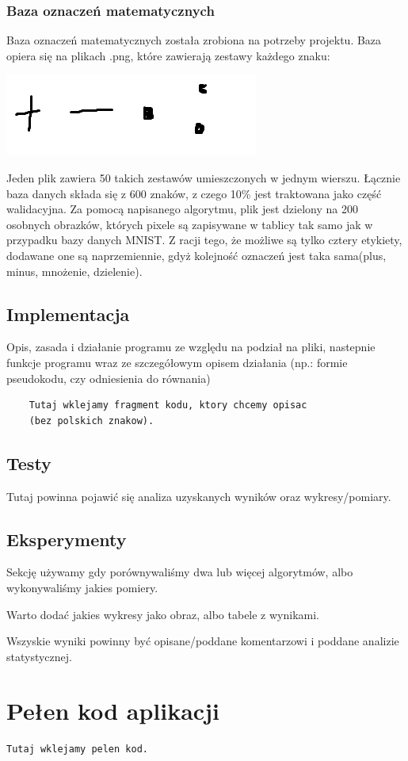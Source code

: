 \documentclass[12pt,a4paper]{article}
\begin{document}
	\subsubsection*{Baza oznaczeń matematycznych}
	Baza oznaczeń matematycznych została zrobiona na potrzeby projektu. Baza opiera się na plikach .png, które zawierają zestawy każdego znaku:
	\begin{center}
	\includegraphics[scale=1]{dane1.png} 
	\end{center}	 
	Jeden plik zawiera 50 takich zestawów umieszczonych w jednym wierszu. Łącznie baza danych składa się z 600 znaków, z czego 10\%  jest traktowana jako część walidacyjna. Za pomocą napisanego algorytmu, plik jest dzielony na 200 osobnych obrazków, których pixele są zapisywane w tablicy tak samo jak w przypadku bazy danych MNIST. Z racji tego, że możliwe są tylko cztery etykiety, dodawane one są naprzemiennie, gdyż kolejność oznaczeń jest taka sama(plus, minus, mnożenie, dzielenie). 
	\subsection*{Implementacja}
	Opis, zasada i działanie programu ze względu na podział na pliki, nastepnie	funkcje programu wraz ze szczegółowym opisem działania (np.: formie pseudokodu, czy odniesienia do równania)
	\begin{lstlisting}
	Tutaj wklejamy fragment kodu, ktory chcemy opisac 
	(bez polskich znakow).
	\end{lstlisting}
	\subsection*{Testy}
	Tutaj powinna pojawić się analiza uzyskanych wyników oraz wykresy/pomiary.
	
	\subsection*{Eksperymenty}
	Sekcję używamy gdy porównywaliśmy dwa lub więcej algorytmów, albo wykonywaliśmy jakies pomiery.
	
	Warto dodać jakies wykresy jako obraz, albo tabele z wynikami. 
	
	Wszyskie wyniki powinny być opisane/poddane komentarzowi i poddane analizie statystycznej.
	\newpage
	\section*{Pełen kod aplikacji}
\begin{lstlisting}
Tutaj wklejamy pelen kod. 
\end{lstlisting}
\end{document}
